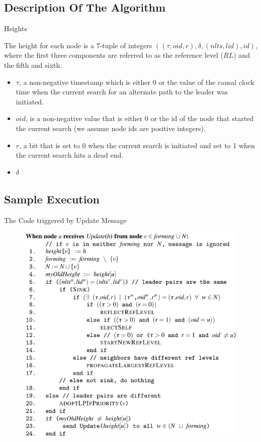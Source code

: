 \documentclass{beamer}
\begin{document}
\subsection{Description Of The Algorithm}
\begin{frame}{Heights}

The height for each node is a 7-tuple of integers $((\tau , oid, r), \delta, (nlts, lid), id)$, where the first three components are referred to as the reference level ($RL$) and the fifth and sixth.

\begin{itemize}
	\item $\tau$, a non-negative timestamp which is either 0 or the value of the causal clock time when the current search for an alternate path to the leader was initiated.
	\item $oid$, is a non-negative value that is either 0 or the id of the node that started the current search (we assume node ids are positive integers).
	\item $r$, a bit that is set to 0 when the current search is initiated and set to 1 when the current search hits a dead end.
	\item $\delta$

\end{itemize}

\end{frame}


\subsection{Sample Execution}

\begin{frame}{The Code triggered by Update Message}
\begin{figure}[h]
	\centering
	\includegraphics[width=0.5\linewidth]{tcode_update.png}
	\label{fig:figure1}
\end{figure}
\end{frame}
\end{document}

